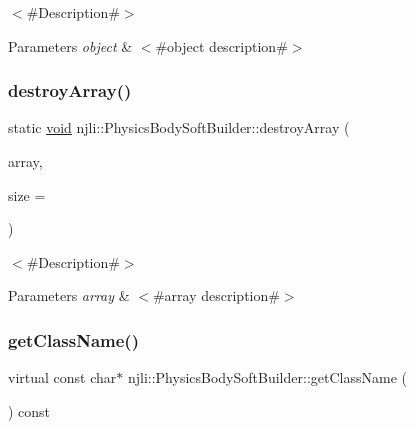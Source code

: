 $<$\#\+Description\#$>$


\begin{DoxyParams}{Parameters}
{\em object} & $<$\#object description\#$>$ \\
\hline
\end{DoxyParams}
\mbox{\label{classnjli_1_1_physics_body_soft_builder_ab732d7732fdd85876a05a5905ab96e57}} 
\subsubsection{\texorpdfstring{destroy\+Array()}{destroyArray()}}
{\footnotesize\ttfamily static \mbox{\hyperlink{_thread_8h_af1e856da2e658414cb2456cb6f7ebc66}{void}} njli\+::\+Physics\+Body\+Soft\+Builder\+::destroy\+Array (\begin{DoxyParamCaption}\item[{\mbox{\hyperlink{classnjli_1_1_physics_body_soft_builder}{Physics\+Body\+Soft\+Builder}} $\ast$$\ast$}]{array,  }\item[{const \mbox{\hyperlink{_util_8h_a10e94b422ef0c20dcdec20d31a1f5049}{u32}}}]{size = {} }\end{DoxyParamCaption})\hspace{0.3cm}{\ttfamily [static]}}

$<$\#\+Description\#$>$


\begin{DoxyParams}{Parameters}
{\em array} & $<$\#array description\#$>$ \\
\hline
\end{DoxyParams}
\mbox{\label{classnjli_1_1_physics_body_soft_builder_ad715623a45b652ea56a8eceb44558267}} 
\subsubsection{\texorpdfstring{get\+Class\+Name()}{getClassName()}}
{\footnotesize\ttfamily virtual const char$\ast$ njli\+::\+Physics\+Body\+Soft\+Builder\+::get\+Class\+Name (\begin{DoxyParamCaption}{ }\end{DoxyParamCaption}) const\hspace{0.3cm}{\ttfamily [virtual]}}

